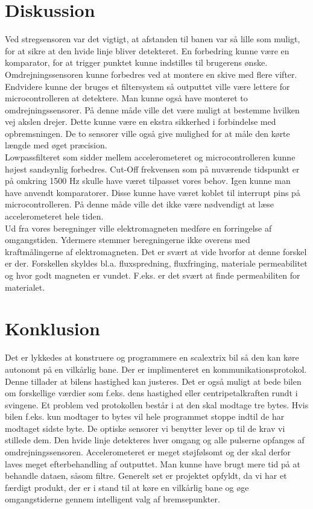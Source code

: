 \section{Diskussion}
Ved stregsensoren var det vigtigt, at afstanden til banen var så lille som muligt, for at sikre at den hvide linje bliver detekteret. En forbedring kunne være en komparator, for at trigger punktet kunne indstilles til brugerens ønske.\\
Omdrejningssensoren kunne forbedres ved at montere en skive med flere vifter. Endvidere kunne der bruges et filtersystem så outputtet ville være lettere for microcontrolleren at detektere. Man kunne også have monteret to omdrejningssensorer. På denne måde ville det være muligt at bestemme hvilken vej akslen drejer. Dette kunne være en ekstra sikkerhed i forbindelse med opbremsningen. De to sensorer ville også give mulighed for at måle den kørte længde med øget præcision.\\
Lowpassfilteret som sidder mellem accelerometeret og microcontrolleren kunne højest sandsynlig forbedres. Cut-Off frekvensen som på nuværende tidspunkt er på omkring 1500 Hz skulle have været tilpasset vores behov. Igen kunne man have anvendt komparatorer. Disse kunne have været koblet til interrupt pins på microcontrolleren. På denne måde ville det ikke være nødvendigt at læse accelerometeret hele tiden.\\
Ud fra vores beregninger ville elektromagneten medføre en forringelse af omgangstiden. Ydermere stemmer beregningerne ikke overens med kraftmålingerne af elektromagneten. Det er svært at vide hvorfor at denne forskel er der. Forskellen skyldes bl.a. fluxspredning, fluxfringing, materiale permeabilitet og hvor godt magneten er vundet. F.eks. er det svært at finde permeabiliten for materialet.\\

\section{Konklusion}
Det er lykkedes at konstruere og programmere en scalextrix bil så den kan køre autonomt på en vilkårlig bane. Der er implimenteret en kommunikationsprotokol. Denne tillader at bilens hastighed kan justeres. Det er også muligt at bede bilen om forskellige værdier som f.eks. dens hastighed eller centripetalkraften rundt i svingene. Et problem ved protokollen består i at den skal modtage tre bytes. Hvis bilen f.eks. kun modtager to bytes vil hele programmet stoppe indtil de har modtaget sidste byte.  
De optiske sensorer vi benytter lever op til de krav vi stillede dem. Den hvide linje detekteres hver omgang og alle pulserne opfanges af omdrejningssensoren. Accelerometeret er meget støjfølsomt og der skal derfor laves meget efterbehandling af outputtet. Man kunne have brugt mere tid på at behandle dataen, såsom filtre. 
Generelt set er projektet opfyldt, da vi har et færdigt produkt, der er i stand til at køre en vilkårlig bane og øge omgangstiderne gennem intelligent valg af bremsepunkter. 

